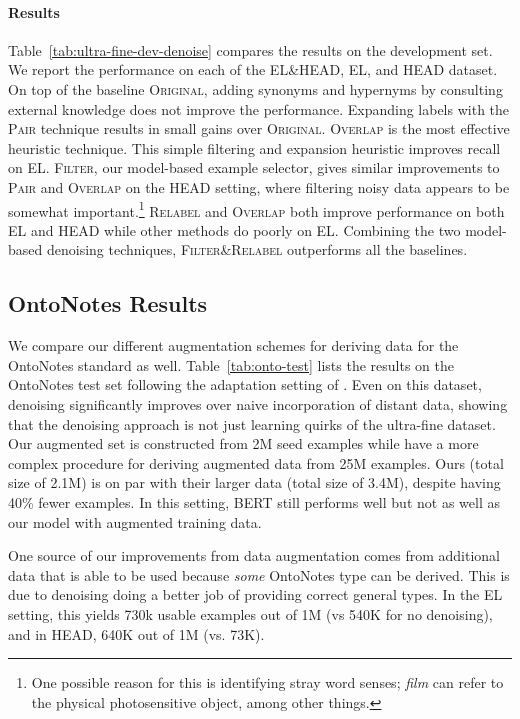 \documentclass[11pt,a4paper]{article}
\begin{document}
\vspace{-4pt}
\paragraph{Results}  Table~\ref{tab:ultra-fine-dev-denoise} compares the results on the development set. We report the performance on each of the EL\:\&\:HEAD, EL, and HEAD dataset. On top of the baseline \textsc{Original}, adding synonyms and hypernyms by consulting external knowledge does not improve the performance. Expanding labels with the \textsc{Pair} technique results in small gains over \textsc{Original}. \textsc{Overlap} is the most effective heuristic technique.  This simple filtering and expansion heuristic improves recall on EL. \textsc{Filter}, our model-based example selector, gives similar improvements to \textsc{Pair} and \textsc{Overlap} on the HEAD setting, where filtering noisy data appears to be somewhat important.\footnote{One possible reason for this is identifying stray word senses; \emph{film} can refer to the physical photosensitive object, among other things.} \textsc{Relabel} and \textsc{Overlap} both improve performance on both EL and HEAD while other methods do poorly on EL. Combining the two model-based denoising techniques, \textsc{Filter\:\&\:Relabel} outperforms all the baselines. 




\subsection{OntoNotes Results}\label{dis-onto}

We compare our different augmentation schemes for deriving data for the OntoNotes standard as well. Table~\ref{tab:onto-test} lists the results on the OntoNotes test set following the adaptation setting of \citet{Eunsol_Choi_18}. Even on this dataset, denoising significantly improves over naive incorporation of distant data, showing that the denoising approach is not just learning quirks of the ultra-fine dataset. Our augmented set is constructed from 2M seed examples while \citet{Eunsol_Choi_18} have a more complex procedure for deriving augmented data from 25M examples. Ours (total size of 2.1M) is on par with their larger data (total size of 3.4M), despite having 40\% fewer examples. In this setting, BERT still performs well but not as well as our model with augmented training data.

One source of our improvements from data augmentation comes from additional data that is able to be used because \emph{some} OntoNotes type can be derived. This is due to denoising doing a better job of providing correct general types. In the EL setting, this yields 730k usable examples out of 1M (vs 540K for no denoising), and in HEAD, 640K out of 1M (vs. 73K).
\end{document}
